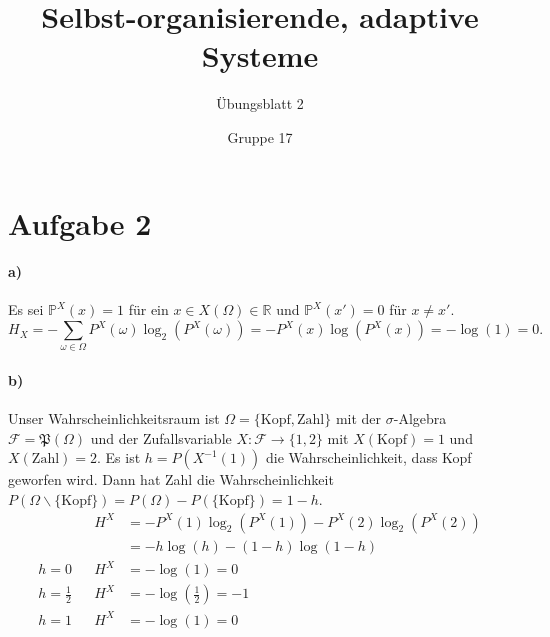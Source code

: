 \documentclass{scrartcl}
\newcommand{\Prob}{\mathbb{P}}
\newcommand{\R}{\mathbb{R}}
\begin{document}
\title{Selbst-organisierende, adaptive Systeme}
\subtitle{Übungsblatt 2}
\author{Gruppe 17}

\maketitle

\section{Aufgabe 2}
\paragraph{a)}
Es sei $\Prob^X(x) = 1$ für ein $x \in X(\Omega) \in \R$ und $\Prob^X(x') = 0$ für $x \neq x'$.
\[
    H_X = - \sum_{\omega \in \Omega} P^X(\omega)\log_2(P^X(\omega)) = -P^X(x)\log(P^X(x)) = -\log(1) = 0.
\]

\paragraph{b)}
Unser Wahrscheinlichkeitsraum ist
$\Omega = \{ \mathrm{Kopf}, \mathrm{Zahl} \}$ mit der $\sigma$-Algebra
$\mathcal{F} = \mathfrak{P}(\Omega)$ und der Zufallsvariable
$X : \mathcal F \to \{ 1, 2 \}$ mit $X(\mathrm{Kopf}) = 1$ und $X(\mathrm{Zahl}) = 2$.
Es ist $h = P(X^{-1}(1))$ die Wahrscheinlichkeit, dass Kopf geworfen wird. Dann
hat Zahl die Wahrscheinlichkeit $P(\Omega\backslash\{\mathrm{Kopf}\}) = P(\Omega) - P(\{\mathrm{Kopf}\}) = 1 - h$.
\begin{align*}
          && H^X & = -P^X(1)\log_2(P^X(1)) - P^X(2)\log_2(P^X(2)) \\
          &&     & = -h\log(h) - (1 - h)\log(1 - h) \\
    h = 0 && H^X & = -\log(1) = 0 \\
    h = \frac{1}{2} && H^X & = -\log\left(\frac{1}{2}\right) = -1 \\
    h = 1 && H^X & = -\log(1) = 0
\end{align*}
\end{document}
